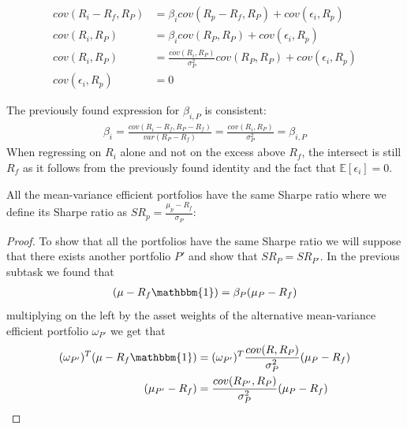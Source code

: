 \documentclass[10pt]{article}
\newcommand{\Ebb}{\mathbb{E}}
\newenvironment{exercise}[2][Exercise]{\begin{trivlist}
  \item[\hskip \labelsep {\bfseries #1}\hskip \labelsep {\bfseries #2.}]}{\end{trivlist}}
\newenvironment{proposition}[2][Proposition]{\begin{trivlist}
  \item[\hskip \labelsep {\bfseries #1}\hskip \labelsep {\bfseries #2.}]}{\end{trivlist}}
\begin{document}
\begin{exercise}{1}
\begin{itemize}
             \begin{align*}
               cov(R_i - R_f, R_P) &= \beta_icov(R_p - R_f, R_P) + cov(\epsilon_i, R_p) \\
               cov(R_i, R_P) &= \beta_icov(R_P, R_P) + cov(\epsilon_i, R_p) \\
               cov(R_i, R_P) &= \frac{cov(R_i, R_P)}{\sigma_P^2}cov(R_P, R_P) + cov(\epsilon_i, R_p) \\
               cov(\epsilon_i, R_p) &= 0
             \end{align*}

             The previously found expression for $\beta_{i, P}$ is consistent:
             \begin{align*}
               \beta_{i} = \frac{cov(R_i - R_f, R_P - R_f)}{var(R_P - R_f)} = \frac{cov(R_i, R_P)}{\sigma_P^2} = \beta_{i, P}
               \end{align*}
               When regressing on $R_i$ alone and not on the excess above $R_f$, the intersect is still
               $R_f$ as it follows from the previously found identity and the
               fact that $\Ebb\left[ \epsilon_i \right] = 0$.
             \item
               \begin{proposition}{[Sharpe-Ratios]}
               All the mean-variance efficient portfolios have the same Sharpe
               ratio where we define its Sharpe ratio as $SR_p = \frac{\mu_p -
                 R_f}{\sigma_P}$:
               \end{proposition}
               \begin{proof}
               To show that all the portfolios have the same Sharpe ratio we will
               suppose that there exists another portfolio $P'$ and show that
               $SR_P = SR_{P'}$.
               In the previous subtask we found that
               \begin{align*}
                 (\mu - R_f \mathbbm{1}) = \beta_P(\mu_P - R_f)
               \end{align*}
               multiplying on the left by the asset weights of the alternative
               mean-variance efficient
               portfolio $\omega_{P'}$ we get that
               \begin{align}
                 (\omega_{P'})^T(\mu - R_f \mathbbm{1}) &= (\omega_{P'})^T \frac{cov(R, R_P)}{\sigma_P^2} (\mu_P - R_f) \\
                 \label{eq:twoportfolios}
                 (\mu_{P'} - R_f) &= \frac{cov(R_{P'}, R_P)}{\sigma_P^2} (\mu_P - R_f)

\end{align}
\end{proof}
\end{itemize}
\end{exercise}
\end{document}
